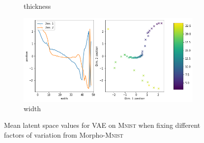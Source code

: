 \documentclass[11pt,a4paper]{article}
\begin{document}
\begin{figure}[H]
\begin{subfigure}{.48\textwidth}
\caption{thickness}
\end{subfigure}
\begin{subfigure}{.48\textwidth}
\includegraphics[width=\textwidth]{images/latent_space_traversals/vae_mnist_morpho_latent_space_values_width.png}
\caption{width}
\end{subfigure}
\caption{Mean latent space values for \ac{VAE} on \textsc{Mnist} when fixing different factors of variation from Morpho-\textsc{Mnist}}
\label{fig:vae_mnist_morpho_latent_space_values}
\end{figure}
\end{document}
